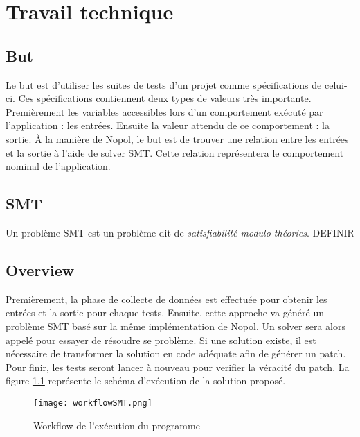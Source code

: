 

\chapter{Travail technique}
	\thispagestyle{document}
	
\section{But}
\label{sec:but}
\par Le but est d'utiliser les suites de tests d'un projet comme spécifications de celui-ci. Ces spécifications contiennent deux types de valeurs très importante. Premièrement les variables accessibles lors d'un comportement exécuté par l'application : les entrées. Ensuite la valeur attendu de ce comportement : la sortie. À la manière de Nopol\cite{nopol}, le but est de trouver une relation entre les entrées et la sortie à l'aide de solver SMT. Cette relation représentera le comportement nominal de l'application.

\section{SMT}
\label{sec:smt}
\par Un problème SMT est un problème dit de \textit{satisfiabilité modulo théories}. DEFINIR




\section{Overview}
\label{sec:overview}
\par Premièrement, la phase de collecte de données est effectuée pour obtenir les entrées et la sortie pour chaque tests. Ensuite, cette approche va généré un problème SMT basé sur la même implémentation de Nopol\cite{nopol}. Un solver sera alors appelé pour essayer de résoudre se problème. Si une solution existe, il est nécessaire de transformer la solution en code adéquate afin de générer un patch. Pour finir, les tests seront lancer à nouveau pour verifier la véracité du patch. La figure \ref{fig:workflow} représente le schéma d'exécution de la solution proposé.


\begin{figure}[H]
\texttt{[image: workflowSMT.png]}
\caption{Workflow de l'exécution du programme}
\label{fig:workflow}
\end{figure}

